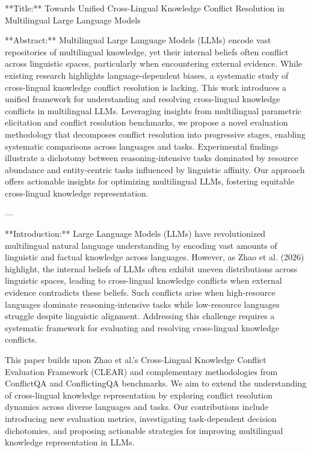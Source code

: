 **Title:** Towards Unified Cross-Lingual Knowledge Conflict Resolution in Multilingual Large Language Models  

**Abstract:**  
Multilingual Large Language Models (LLMs) encode vast repositories of multilingual knowledge, yet their internal beliefs often conflict across linguistic spaces, particularly when encountering external evidence. While existing research highlights language-dependent biases, a systematic study of cross-lingual knowledge conflict resolution is lacking. This work introduces a unified framework for understanding and resolving cross-lingual knowledge conflicts in multilingual LLMs. Leveraging insights from multilingual parametric elicitation and conflict resolution benchmarks, we propose a novel evaluation methodology that decomposes conflict resolution into progressive stages, enabling systematic comparisons across languages and tasks. Experimental findings illustrate a dichotomy between reasoning-intensive tasks dominated by resource abundance and entity-centric tasks influenced by linguistic affinity. Our approach offers actionable insights for optimizing multilingual LLMs, fostering equitable cross-lingual knowledge representation.  

---

**Introduction:**  
Large Language Models (LLMs) have revolutionized multilingual natural language understanding by encoding vast amounts of linguistic and factual knowledge across languages. However, as Zhao et al. (2026) highlight, the internal beliefs of LLMs often exhibit uneven distributions across linguistic spaces, leading to cross-lingual knowledge conflicts when external evidence contradicts these beliefs. Such conflicts arise when high-resource languages dominate reasoning-intensive tasks while low-resource languages struggle despite linguistic alignment. Addressing this challenge requires a systematic framework for evaluating and resolving cross-lingual knowledge conflicts.

This paper builds upon Zhao et al.'s Cross-Lingual Knowledge Conflict Evaluation Framework (CLEAR) and complementary methodologies from ConflictQA and ConflictingQA benchmarks. We aim to extend the understanding of cross-lingual knowledge representation by exploring conflict resolution dynamics across diverse languages and tasks. Our contributions include introducing new evaluation metrics, investigating task-dependent decision dichotomies, and proposing actionable strategies for improving multilingual knowledge representation in LLMs.

